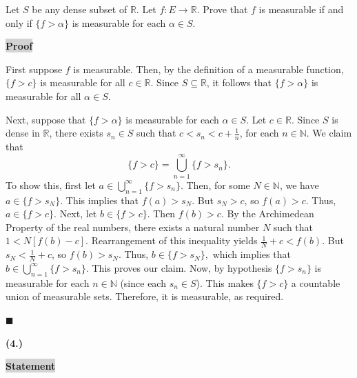 \documentclass[12pt]{article}
\newcommand{\mybox}{%
    \collectbox{%
        \setlength{\fboxsep}{2pt}%
        \fbox{\BOXCONTENT}%
    }%
}
\begin{document}
\noindent Let $S$ be any dense subset of $\mathbb{R}$. Let $f:E\rightarrow\mathbb{R}$. Prove that $f$ is measurable if and only if $\lbrace f>\alpha \rbrace$ is measurable for each $\alpha\in S$.

\vspace{5mm}

\noindent\mybox{\colorbox{lightgray}{\textbf{Proof}}}\hspace{3mm}\hrulefill

\noindent First suppose $f$ is measurable. Then, by the definition of a measurable function, $\lbrace f>c\rbrace$ is measurable for all $c\in\mathbb{R}$. Since $S\subseteq\mathbb{R}$, it follows that $\lbrace f>\alpha \rbrace$ is measurable for all $\alpha\in S$. 

\vspace{7mm}

\noindent Next, suppose that $\lbrace f > \alpha \rbrace$ is measurable for each $\alpha\in S$. Let $c\in\mathbb{R}$. Since $S$ is dense in $\mathbb{R}$, there exists $s_n\in S$ such that $c < s_n < c + \frac{1}{n}$, for each $n\in\mathbb{N}$. We claim that $$\lbrace f > c \rbrace = \bigcup\limits_{n=1}^{\infty} \lbrace f > s_n \rbrace.$$ To show this, first let $a\in\bigcup\limits_{n=1}^{\infty} \lbrace f > s_n \rbrace$. Then, for some $N\in\mathbb{N}$, we have $a\in\lbrace f > s_N \rbrace$. This implies that $f(a) > s_N$. But $s_N > c$, so $f(a) > c$. Thus, $a\in\lbrace f > c \rbrace$. Next, let $b\in\lbrace f > c\rbrace$. Then $f(b) > c.$ By the Archimedean Property of the real numbers, there exists a natural number $N$ such that $1<N\left[f(b) - c\right]$. Rearrangement of this inequality yields $\frac{1}{N} + c < f(b)$. But $s_N < \frac{1}{N} + c$, so $f(b) > s_N$. Thus, $b\in\lbrace f > s_N\rbrace,$ which implies that $b\in\bigcup\limits_{n=1}^{\infty} \lbrace f > s_n \rbrace$. This proves our claim. Now, by hypothesis $\lbrace f > s_n \rbrace$ is measurable for each $n\in\mathbb{N}$ (since each $s_n\in S$). This makes $\lbrace f > c \rbrace$ a countable union of measurable sets. Therefore, it is measurable, as required. 

\hfill$\blacksquare$

\pagebreak

\noindent \textbf{(4.)}

\vspace{3mm}

\noindent\mybox{\colorbox{lightgray}{\textbf{Statement}}}\hspace{3mm}\hrulefill
\end{document}

